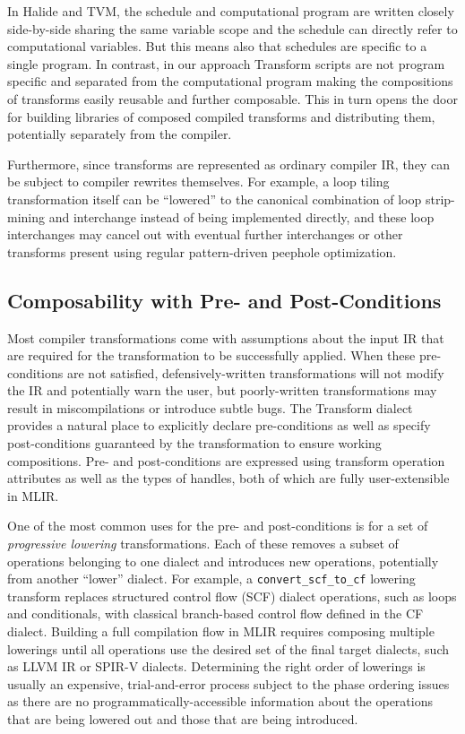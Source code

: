 \documentclass[screen,nonacm,authorversion]{acmart}
\begin{document}
In Halide and TVM, the schedule and computational program are written closely side-by-side sharing the same variable scope and the schedule can directly refer to computational variables.
But this means also that schedules are specific to a single program.
In contrast, in our approach Transform scripts are not program specific and separated from the computational program making the compositions of transforms easily reusable and further composable.
This in turn opens the door for building libraries of composed compiled transforms and distributing them, potentially separately from the compiler.

Furthermore, since transforms are represented as ordinary compiler IR, they can be subject to compiler rewrites themselves. For example, a loop tiling transformation itself can be ``lowered'' to the canonical combination of loop strip-mining and interchange instead of being implemented directly, and these loop interchanges may cancel out with eventual further interchanges or other transforms present using regular pattern-driven peephole optimization. 

\subsection{Composability with Pre- and Post-Conditions}
\label{sec:pre-post-conditions}
Most compiler transformations come with assumptions about the input IR that are required for the transformation to be successfully applied. When these pre-conditions are not satisfied, defensively-written transformations will not modify the IR and potentially warn the user, but poorly-written transformations may result in miscompilations or introduce subtle bugs. The Transform dialect provides a natural place to explicitly declare pre-conditions as well as specify post-conditions guaranteed by the transformation to ensure working compositions. Pre- and post-conditions are expressed using transform operation attributes as well as the types of handles, both of which are fully user-extensible in MLIR.

One of the most common uses for the pre- and post-conditions is for a set of \emph{progressive lowering} transformations. Each of these removes a subset of operations belonging to one dialect and introduces new operations, potentially from another ``lower'' dialect. For example, a \texttt{convert\_scf\_to\_cf} lowering transform replaces structured control flow (SCF) dialect operations, such as loops and conditionals, with classical branch-based control flow defined in the CF dialect. Building a full compilation flow in MLIR requires composing multiple lowerings until all operations use the desired set of the final target dialects, such as LLVM IR or SPIR-V dialects.
Determining the right order of lowerings is usually an expensive, trial-and-error process subject to the phase ordering issues~\cite{mlir-not-ml-compiler} as there are no programmatically-accessible information about the operations that are being lowered out and those that are being introduced.
\end{document}

